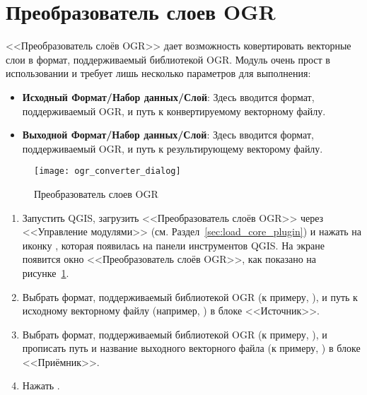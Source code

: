 
\section{Преобразователь слоев OGR}


<<Преобразователь слоёв OGR>> дает возможность ковертировать векторные слои
в формат, поддерживаемый библиотекой OGR.  Модуль очень прост в использовании и требует лишь несколько
параметров для выполнения:

\begin{itemize}[label=--]
\item \textbf{Исходный Формат/Набор данных/Слой}: Здесь вводится
формат, поддерживаемый OGR, и путь к конвертируемому векторному файлу.
\item \textbf{Выходной Формат/Набор данных/Слой}: Здесь вводится
формат, поддерживаемый OGR, и путь к результирующему векторому файлу.
\end{itemize}

\begin{figure}[ht]
 \centering
   \texttt{[image: ogr\_converter\_dialog]}
   \caption{Преобразователь слоев OGR \wincaption}\label{fig:ogr_converter_dialog}
\end{figure}


\begin{enumerate}
  \item Запустить QGIS, загрузить <<Преобразователь слоёв OGR>> через
  <<Управление модулями>> (см. Раздел~\ref{sec:load_core_plugin}) и
  нажать на иконку ,
  которая появилась на панели инструментов QGIS. На экране появится окно
  <<Преобразователь слоёв OGR>>, как показано на рисунке~\ref{fig:ogr_converter_dialog}.
  \item Выбрать формат, поддерживаемый библиотекой OGR (к примеру,
  ), и путь к исходному
  векторному файлу (например, ) в блоке <<Источник>>.
  \item Выбрать формат, поддерживаемый библиотекой OGR (к примеру,
  ), и прописать путь и название выходного
  векторного файла (к примеру, ) в блоке <<Приёмник>>.
  \item Нажать .
\end{enumerate}

\FloatBarrier
